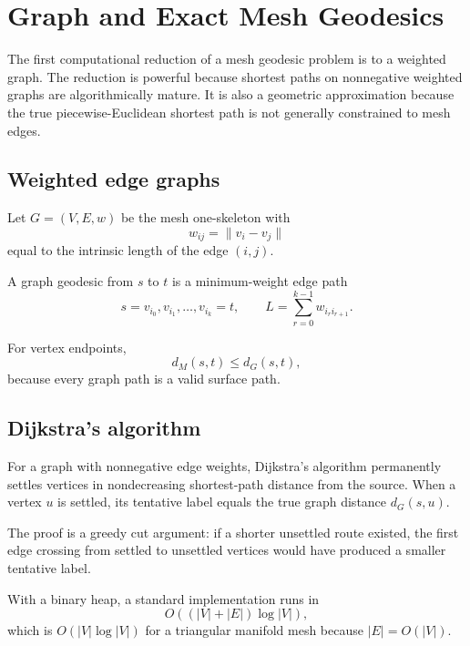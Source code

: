 \chapter{Graph and Exact Mesh Geodesics}
\label{ch:vii39}

The first computational reduction of a mesh geodesic problem is to a weighted
graph.  The reduction is powerful because shortest paths on nonnegative weighted
graphs are algorithmically mature.  It is also a geometric approximation because
the true piecewise-Euclidean shortest path is not generally constrained to mesh
edges.

\section{Weighted edge graphs}

Let \(G=(V,E,w)\) be the mesh one-skeleton with
\[
w_{ij}=\|v_i-v_j\|
\]
equal to the intrinsic length of the edge \((i,j)\).

\begin{definition}\label{def:vii39-graph}
A graph geodesic from \(s\) to \(t\) is a minimum-weight edge path
\[
s=v_{i_0},v_{i_1},\ldots,v_{i_k}=t,
\qquad
L=\sum_{r=0}^{k-1}w_{i_r i_{r+1}}.
\]
\end{definition}

For vertex endpoints,
\[
d_M(s,t)\le d_G(s,t),
\]
because every graph path is a valid surface path.

\section{Dijkstra's algorithm}

\begin{theorem}\label{thm:vii39-dijkstra}
For a graph with nonnegative edge weights, Dijkstra's algorithm permanently
settles vertices in nondecreasing shortest-path distance from the source.  When a
vertex \(u\) is settled, its tentative label equals the true graph distance
\(d_G(s,u)\).
\end{theorem}

The proof is a greedy cut argument: if a shorter unsettled route existed, the
first edge crossing from settled to unsettled vertices would have produced a
smaller tentative label.

With a binary heap, a standard implementation runs in
\[
O((|V|+|E|)\log |V|),
\]
which is \(O(|V|\log |V|)\) for a triangular manifold mesh because
\(|E|=O(|V|)\).

